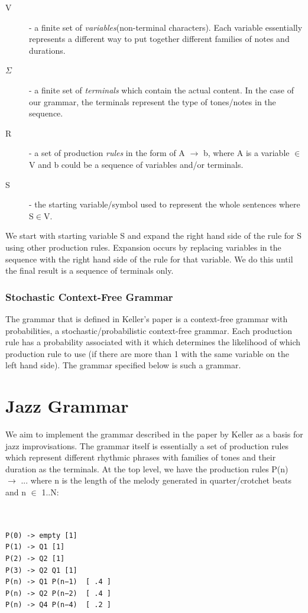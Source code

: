 \documentclass[pdftex,12pt,a4paper]{report}
\begin{document}
\begin{description}
  \item[V] - a finite set of \emph{variables}(non-terminal characters). Each variable essentially represents a different way to put together different families of notes and durations.
  \item[$\Sigma$]  - a finite set of \emph{terminals} which contain the actual content. In the case of our grammar, the terminals represent the type of tones/notes in the sequence.
  \item[R] - a set of production \emph{rules} in the form of A $\rightarrow$ b, where A is a variable $\in$V and b could be a sequence of variables and/or terminals.
  \item[S] - the starting variable/symbol used to represent the whole sentences where S$\in$V.
\end{description}


We start with starting variable S and expand the right hand side of the rule for S using other production rules. Expansion occurs by replacing variables in the sequence with the right hand side of the rule for that variable. We do this until the final result is a sequence of terminals only.

\subsubsection{Stochastic Context-Free Grammar}
The grammar that is defined in Keller's paper \cite{keller07} is a context-free grammar with probabilities, a stochastic/probabilistic context-free grammar. Each production rule has a probability associated with it which determines the likelihood of which production rule to use (if there are more than 1 with the same variable on the left hand side). The grammar specified below is such a grammar.

\section{Jazz Grammar}
We aim to implement the grammar described in the paper by Keller \cite{keller07} as a basis for jazz improvisations. The grammar itself is essentially a set of production rules which represent different rhythmic phrases with families of tones and their duration as the terminals. At the top level, we have the production rules P(n) $\rightarrow$ ... where n is the length of the melody generated in quarter/crotchet beats and n $\in$ 1..N:

\begin{verbatim}


P(0) -> empty [1]
P(1) -> Q1 [1] 
P(2) -> Q2 [1] 
P(3) -> Q2 Q1 [1] 
P(n) -> Q1 P(n−1)  [ .4 ]
P(n) -> Q2 P(n−2)  [ .4 ] 
P(n) -> Q4 P(n−4)  [ .2 ]

\end{verbatim}
\end{document}
